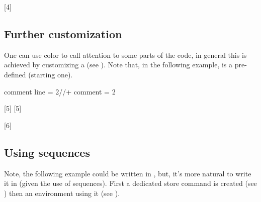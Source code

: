 [4]


\subsection{Further customization}
One can use color to call attention to some parts of the code, in general this is achieved by customizing a  (see ). Note that, in the following example,  is a pre-defined  (starting one).
\begin{codestore}[demo01]
  {
    comment line = {2}{//+}{ }
  }
  {
    comment = {2}{\itshape\color{red}}
  }
\end{codestore}
[5]
[5]

\begin{codestore}[demo01]
\end{codestore}

[6]

\subsection{Using sequences}

Note, the following example could be written in \LaTeXe{}, but, it's more natural to write it in  (given the use of sequences).
First a dedicated store command is created (see ) then an environment using it (see ).


